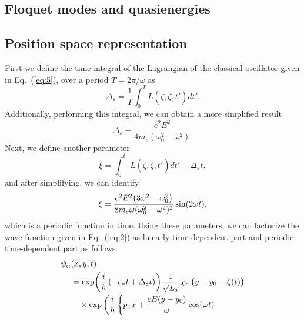 \documentclass[
 reprint,
 amsmath,amssymb,
 aps,
 prb,
]{revtex4-2}
\begin{document}
\begin{appendix}
\section{\label{appendix_b} Floquet modes and quasienergies}

\subsection{Position space representation}

First we define the time integral of the Lagrangian of the classical oscillator given in Eq.~(\ref{eq:5}), over a period $T=2\pi/\omega$ as
\begin{equation} \label{eq:b1}
  \Delta_{\varepsilon} = \frac{1}{T} \int_0^T L(\zeta,\dot{\zeta},t') dt'.
\end{equation}
Additionally, performing this integral, we can obtain a more simplified result
\begin{equation} \label{eq:b2}
  \Delta_{\varepsilon} = \frac{e^2E^2}{4m_e(\omega_0^2 - \omega^2)}.
\end{equation}
Next, we define another parameter
\begin{equation} \label{eq:b3}
  \xi =
  \int_0^t \; L(\zeta,\dot{\zeta},t') dt' -
  \Delta_{\varepsilon} t,
\end{equation}
and after simplifying, we can identify
\begin{equation} \label{eq:b4}
  \xi =
  \frac{e^2E^2\qty(3\omega^2 - \omega_0^2)}{8m_e\omega(\omega_0^2 - \omega^2)^2} \sin(2\omega t),
\end{equation}
which is a periodic function in time. Using these parameters, we can factorize the wave function given in Eq.~(\ref{eq:2}) as linearly time-dependent part and periodic time-dependent part as follows
\begin{equation} \label{eq:b5}
  \begin{aligned}
    \psi_{\alpha}&(x,y,t) \\
    & =
    \exp(\frac{i}{\hbar} \left(-\epsilon_nt + \Delta_{\varepsilon} t \right) )
    \frac{1}{\sqrt{L_x}} \chi_n\bm{\left(}y - y_0 - \zeta(t)\bm{\right)}
    \\
    & \quad\times
    \exp \left(
       \frac{i}{\hbar}
       \left\{
       p_x x +
       \frac{eE(y-y_0)}{\omega}\cos(\omega t)  \right. \right. \\

\end{aligned}
\end{equation}
\end{appendix}
\end{document}

